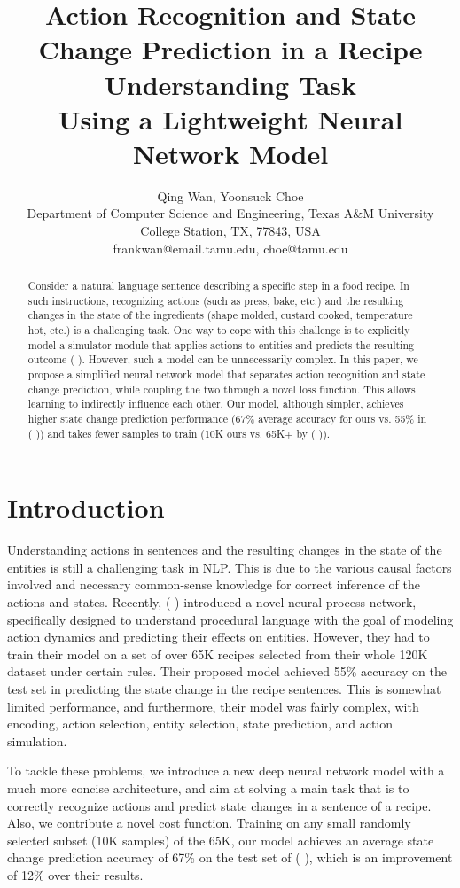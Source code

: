 \documentclass[letterpaper]{article}
\title{Action Recognition and State Change Prediction in a Recipe Understanding Task \\
	Using a Lightweight Neural Network Model \\}
\author{
	Qing Wan,
	Yoonsuck Choe \\
	Department of Computer Science and Engineering, Texas A\&M University\\
	College Station, TX, 77843, USA \\
	frankwan@email.tamu.edu, choe@tamu.edu
}
\newcommand{\citealp}[1]{\citeauthor{#1} \citeyear{#1}}
\begin{document}
\maketitle

\begin{abstract}
Consider a natural language sentence describing a specific step in a food recipe. In such instructions, recognizing actions (such as press, bake, etc.) and the resulting changes in the state of the ingredients (shape molded, custard cooked, temperature hot, etc.) is a challenging task. One way to cope with this challenge is to explicitly model a simulator module that applies actions to entities and predicts the resulting outcome (\citealp{bosselut2017simulating}). However, such a model can be unnecessarily complex. In this paper, we propose a simplified neural network model that separates action recognition and state change prediction, while coupling the two through a novel loss function.  This allows learning to indirectly influence each other. Our model, although simpler, achieves higher state change prediction performance (67\% average accuracy for ours vs. 55\% in (\citealp{bosselut2017simulating})) and takes fewer samples to train (10K ours vs. 65K+ by (\citealp{bosselut2017simulating})).
\end{abstract}

\noindent
\section*{Introduction}
Understanding actions in sentences and the resulting changes in the state of the entities is still a challenging task in NLP.  This is due to the various causal factors involved and necessary common-sense knowledge for correct inference of the actions and states. Recently, (\citealp{bosselut2017simulating}) introduced a novel neural process network, specifically designed to understand procedural language with the goal of modeling action dynamics and predicting their effects on entities. However, they had to train their model on a set of over 65K recipes selected from their whole 120K dataset under certain rules. Their proposed model achieved 55\% accuracy on the test set in predicting the state change in the recipe sentences. This is somewhat limited performance, and furthermore, their model was fairly complex, with encoding, action selection, entity selection, state prediction, and action simulation.

To tackle these problems, we introduce a new deep neural network model with a much more concise architecture, and aim at solving a main task that is to correctly recognize actions and predict state changes in a sentence of a recipe. Also, we contribute a novel cost function. Training on any small randomly selected subset (10K samples) of the 65K, our model achieves an average state change prediction accuracy of 67\% on the test set of (\citealp{bosselut2017simulating}), which is an improvement of 12\% over their results.
\end{document}
